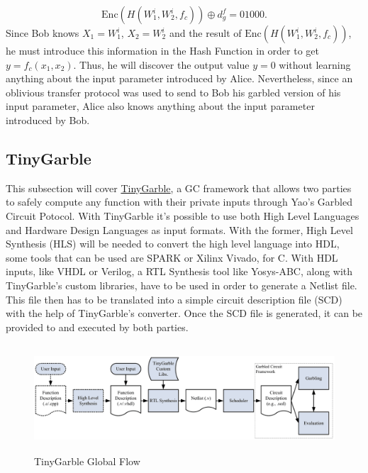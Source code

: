 \begin{refsection}
\begin{equation}\label{eq:decryptiongarbled}
  \textrm{Enc}(H(W_1^i,W_2^i,f_c ))\oplus d_g^f = 0 1 0 0 0.
\end{equation}
Since Bob knows $X_1 = W_1^i$, $X_2=W_2^i$ and the result of $\textrm{Enc}(H(W_1^i,W_2^i,f_c ))$, he must introduce this information in the Hash Function in order to get $y=f_c(x_1,x_2)$. Thus, he will discover the output value $y=0$ without learning anything about the input parameter introduced by Alice. Nevertheless, since an oblivious transfer protocol was used to send to Bob his garbled version of his input parameter, Alice also knows anything about the input parameter introduced by Bob.

\newpage

\subsection{TinyGarble}
	
This subsection will cover \href{https://github.com/esonghori/TinyGarble}{TinyGarble}, a GC framework that allows two parties to safely compute any function with their private inputs through Yao's Garbled Circuit Potocol.
With TinyGarble it's possible to use both High Level Languages and Hardware Design Languages as input formats. With the former, High Level Synthesis (HLS) will be needed to convert the high level language into HDL, some tools that can be used are SPARK or Xilinx Vivado, for C.
With HDL inputs, like VHDL or Verilog, a  RTL Synthesis tool like Yosys-ABC, along with TinyGarble's custom libraries, have to be used in order to generate a Netlist file. This file then has to be translated into a simple circuit description file (SCD) with the help of TinyGarble's converter.
Once the SCD file is generated, it can be provided to and executed by both parties.

\begin{figure}[H]
	\centering
	\includegraphics[width=1\textwidth, height=4cm]{./sdf/secure_multiparty_computation/figures/tiny_garble_flow.png}
    \caption{TinyGarble Global Flow\cite{Songhori}}\label{fig:tinygarble_flow}
\end{figure}


\end{refsection}
